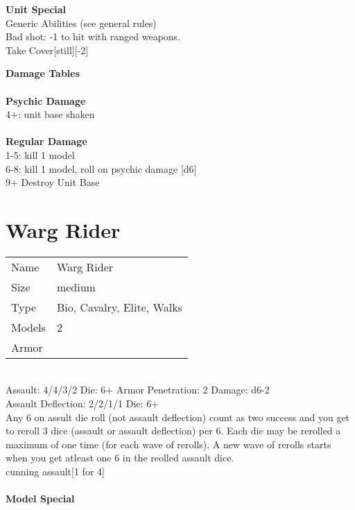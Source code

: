 {\bf Unit Special} \\
Generic Abilities (see general rules) \\Bad shot: -1 to hit with ranged weapons. \\ Take Cover[still][-2]

{\bf Damage Tables} \\
\ \\ {\bf Psychic Damage } \\
4+: unit base shaken \\
\ \\ {\bf Regular Damage } \\
1-5: kill 1 model \\
6-8: kill 1 model, roll on psychic damage [d6] \\
9+ Destroy Unit Base \\










\pagebreak

\section{ Warg Rider }

\begin{tabular}{ll}
  Name & Warg Rider \\
  Size & medium\\
  Type & Bio, Cavalry, Elite, Walks\\
  Models & 2\\
  Armor & \\
\end{tabular}



\ \\
Assault: 4/4/3/2 Die: 6+ Armor Penetration: 2 Damage: d6-2 \\
Assault Deflection: 2/2/1/1 Die: 6+\\
\indent Any 6 on assult die roll (not assault deflection) count as two success and you get to reroll 3 dice (assault or assault deflection) per 6. Each die may be rerolled a maximum of one time (for each wave of rerolls). A new wave of rerolls starts when you get atleast one 6 in the reolled assault dice.\\ cunning assault[1 for 4] \\
\ \\
{\bf Model Special} \\

